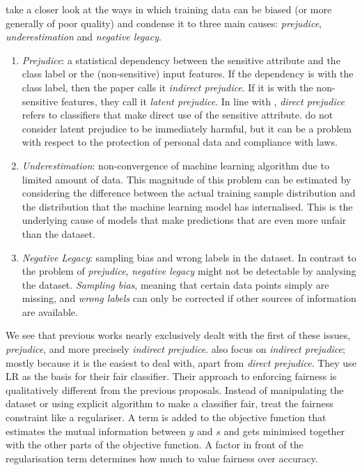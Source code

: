 \citet{kamishima2012fairness} take a closer look
at the ways in which training data can be biased (or more generally of poor quality) and condense it to three main causes:
\emph{prejudice}, \emph{underestimation} and \emph{negative legacy}.

\begin{enumerate}
\item
  \emph{Prejudice}:
  a statistical dependency between the sensitive attribute
  and the class label or the (non-sensitive) input features.
  If the dependency is with the class label, then the paper calls it \emph{indirect prejudice}.
  If it is with the non-sensitive features, they call it \emph{latent prejudice}.
  In line with \citet{pedreshi2008discrimination},
  \emph{direct prejudice} refers to classifiers that make direct use of the sensitive attribute.
  \citet{kamishima2012fairness} do not consider latent prejudice to be immediately harmful,
  but it can be a problem with respect to the protection of personal data and compliance with laws.
\item
  \emph{Underestimation}:
  non-convergence of machine learning algorithm due to limited amount of data.
  This magnitude of this problem can be estimated
  by considering the difference between the actual training sample distribution
  and the distribution that the machine learning model has internalised.
  This is the underlying cause of models that make predictions
  that are even more unfair than the dataset.
\item
  \emph{Negative Legacy}:
  sampling bias and wrong labels in the dataset.
  In contrast to the problem of \emph{prejudice},
  \emph{negative legacy} might not be detectable by analysing the dataset.
  \emph{Sampling bias}, meaning that certain data points simply are missing,
  and \emph{wrong labels} can only be corrected if other sources of information are available.
\end{enumerate}

We see that previous works nearly exclusively dealt with the first of these issues, \emph{prejudice},
and more precisely \emph{indirect prejudice}.
\citet{kamishima2012fairness} also focus on \emph{indirect prejudice};
mostly because it is the easiest to deal with, apart from \emph{direct prejudice}.
They use \acf{LR} as the basis for their fair classifier.
Their approach to enforcing fairness is qualitatively different from the previous proposals.
Instead of manipulating the dataset or using explicit algorithm to make a classifier fair,
\citet{kamishima2012fairness} treat the fairness constraint like a regulariser.
A term is added to the objective function
that estimates the mutual information between \(y\) and \(s\)
and gets minimised together with the other parts of the objective function.
A factor in front of the regularisation term determines how much to value fairness over accuracy.

